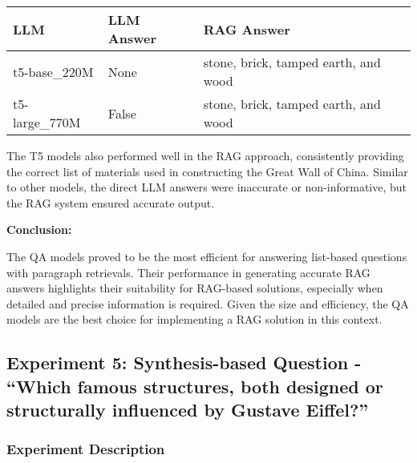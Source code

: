 \documentclass[11pt]{wseas}
\begin{document}
\begin{longtable}[]{@{}
  >{\raggedright\arraybackslash}p{}
  >{\raggedright\arraybackslash}p{}
  >{\raggedright\arraybackslash}p{}@{}}
\toprule\noalign{}
\begin{minipage}[b]{\linewidth}\raggedright
LLM
\end{minipage} & \begin{minipage}[b]{\linewidth}\raggedright
LLM Answer
\end{minipage} & \begin{minipage}[b]{\linewidth}\raggedright
RAG Answer
\end{minipage} \\
\midrule\noalign{}
\endhead
\bottomrule\noalign{}
\endlastfoot
t5-base\_220M & None & stone, brick, tamped earth, and wood \\
t5-large\_770M & False & stone, brick, tamped earth, and wood \\
\end{longtable}

The T5 models also performed well in the RAG approach, consistently
providing the correct list of materials used in constructing the Great
Wall of China. Similar to other models, the direct LLM answers were
inaccurate or non-informative, but the RAG system ensured accurate
output.

\textbf{Conclusion:}

The QA models proved to be the most efficient for answering list-based
questions with paragraph retrievals. Their performance in generating
accurate RAG answers highlights their suitability for RAG-based
solutions, especially when detailed and precise information is required.
Given the size and efficiency, the QA models are the best choice for
implementing a RAG solution in this context.

    \newpage

\subsection{Experiment 5: Synthesis-based Question - ``Which famous
structures, both designed or structurally influenced by Gustave
Eiffel?''}\label{experiment-5-synthesis-based-question---which-famous-structures-both-designed-or-structurally-influenced-by-gustave-eiffel}

\subsubsection{Experiment Description}\label{experiment-description}
\end{document}
